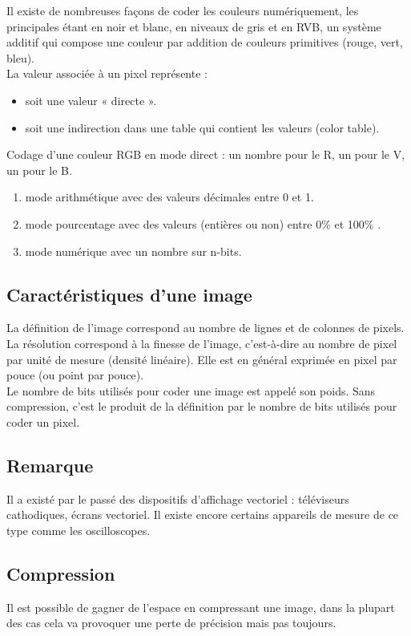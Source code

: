 \documentclass[a4paper,10pt]{book}
\begin{document}
Il existe de nombreuses façons de coder les couleurs numériquement, les principales étant en noir et blanc, en niveaux de gris et en RVB, un système additif qui compose une couleur par addition de couleurs primitives (rouge, vert, bleu).\\

La valeur associée à un pixel représente : \begin{itemize} 
\item soit une valeur « directe ».
\item soit une indirection dans une table qui contient les valeurs (color table).\\ \end{itemize}

Codage d'une couleur RGB en mode direct : un nombre pour le R, un pour le V, un pour le B.\begin{enumerate}
\item mode arithmétique avec des valeurs décimales entre 0 et 1.
\item mode pourcentage avec des valeurs (entières ou non) entre 0\% et 100\% .
\item mode numérique avec un nombre sur n-bits. \end{enumerate}

\subsection{Caractéristiques d’une image}
La définition de l’image correspond au nombre de lignes et de colonnes de pixels.\\

La résolution correspond à la finesse de l’image, c'est-à-dire au nombre de pixel par unité de mesure (densité linéaire). Elle est en général exprimée en pixel par pouce (ou point par pouce).\\

Le nombre de bits utilisés pour coder une image est appelé son poids. Sans compression, c’est le produit de la définition par le nombre de bits utilisés pour coder un pixel.

\subsection*{Remarque}
Il a existé par le passé des dispositifs d’affichage vectoriel : téléviseurs cathodiques, écrans vectoriel. Il existe encore certains appareils de mesure de ce type comme les oscilloscopes.

\subsection{Compression}
Il est possible de gagner de l'espace en compressant une image, dans la plupart des cas cela va provoquer une perte de précision mais pas toujours.\\
\end{document}
